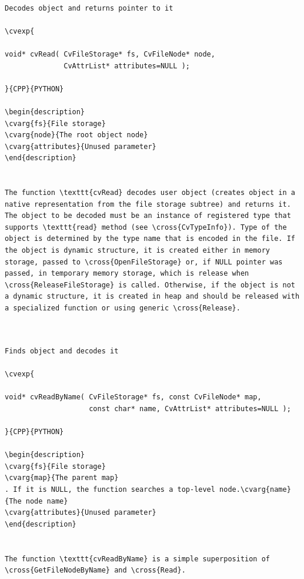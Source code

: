 \begin{verbatim}

Decodes object and returns pointer to it

\cvexp{

void* cvRead( CvFileStorage* fs, CvFileNode* node,
              CvAttrList* attributes=NULL );

}{CPP}{PYTHON}

\begin{description}
\cvarg{fs}{File storage}
\cvarg{node}{The root object node}
\cvarg{attributes}{Unused parameter}
\end{description}


The function \texttt{cvRead} decodes user object (creates object in a native representation from the file storage subtree) and returns it. The object to be decoded must be an instance of registered type that supports \texttt{read} method (see \cross{CvTypeInfo}). Type of the object is determined by the type name that is encoded in the file. If the object is dynamic structure, it is created either in memory storage, passed to \cross{OpenFileStorage} or, if NULL pointer was passed, in temporary memory storage, which is release when \cross{ReleaseFileStorage} is called. Otherwise, if the object is not a dynamic structure, it is created in heap and should be released with a specialized function or using generic \cross{Release}.


\end{verbatim}
\label{ReadByName}
\begin{verbatim}

Finds object and decodes it

\cvexp{

void* cvReadByName( CvFileStorage* fs, const CvFileNode* map,
                    const char* name, CvAttrList* attributes=NULL );

}{CPP}{PYTHON}

\begin{description}
\cvarg{fs}{File storage}
\cvarg{map}{The parent map}
. If it is NULL, the function searches a top-level node.\cvarg{name}{The node name}
\cvarg{attributes}{Unused parameter}
\end{description}


The function \texttt{cvReadByName} is a simple superposition of \cross{GetFileNodeByName} and \cross{Read}.


\end{verbatim}
\label{ReadRawData}
